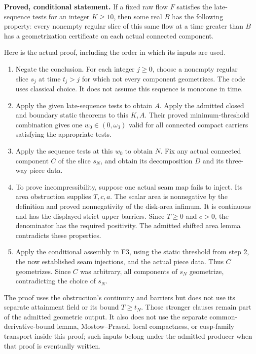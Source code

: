 \documentclass[
  letterpaper,
  11pt]{article}
\providecommand{\tightlist}{%
  \setlength{\itemsep}{0pt}\setlength{\parskip}{0pt}}
\begin{document}
\textbf{Proved, conditional statement.} If a fixed raw flow \(F\)
satisfies the late-sequence tests for an integer \(K\geq10\), then some
real \(B\) has the following property: every nonempty regular slice of
this same flow at a time greater than \(B\) has a geometrization
certificate on each actual connected component.

Here is the actual proof, including the order in which its inputs are
used.

\begin{enumerate}
\def\labelenumi{\arabic{enumi}.}
\tightlist
\item
  Negate the conclusion. For each integer \(j\geq0\), choose a nonempty
  regular slice \(s_j\) at time \(t_j>j\) for which not every component
  geometrizes. The code uses classical choice. It does not assume this
  sequence is monotone in time.
\item
  Apply the given late-sequence tests to obtain \(A\). Apply the
  admitted closed and boundary static theorems to this \(K,A\). Their
  proved minimum-threshold combination gives one \(w_0\in(0,\omega_3)\)
  valid for all connected compact carriers satisfying the appropriate
  tests.
\item
  Apply the sequence tests at this \(w_0\) to obtain \(N\). Fix any
  actual connected component \(C\) of the slice \(s_N\), and obtain its
  decomposition \(D\) and its three-way piece data.
\item
  To prove incompressibility, suppose one actual seam map fails to
  inject. Its area obstruction supplies \(T,c,a\). The scalar area is
  nonnegative by the definition and proved nonnegativity of the
  disk-area infimum. It is continuous and has the displayed strict upper
  barriers. Since \(T\geq0\) and \(c>0\), the denominator has the
  required positivity. The admitted shifted area lemma contradicts these
  properties.
\item
  Apply the conditional assembly in F3, using the static threshold from
  step 2, the now established seam injections, and the actual piece
  data. Thus \(C\) geometrizes. Since \(C\) was arbitrary, all
  components of \(s_N\) geometrize, contradicting the choice of \(s_N\).
\end{enumerate}

The proof uses the obstruction's continuity and barriers but does not
use its separate attainment field or its bound \(T\geq t_N\). Those
stronger clauses remain part of the admitted geometric output. It also
does not use the separate common-derivative-bound lemma, Mostow--Prasad,
local compactness, or cusp-family transport inside this proof; such
inputs belong under the admitted producer when that proof is eventually
written.
\end{document}
